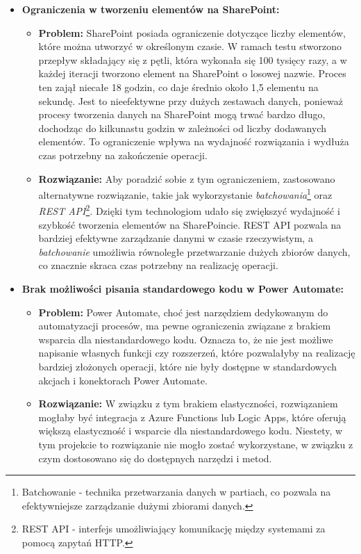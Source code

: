 \begin{itemize}
      \item \textbf{Ograniczenia w tworzeniu elementów na SharePoint:}
            \begin{itemize}
                  \item \textbf{Problem:} SharePoint posiada ograniczenie dotyczące liczby elementów, które można utworzyć w określonym czasie. W ramach testu stworzono przepływ składający się z pętli, która wykonała się 100 tysięcy razy, a w każdej iteracji tworzono element na SharePoint o losowej nazwie. Proces ten zajął niecałe 18 godzin, co daje średnio około 1,5 elementu na sekundę. Jest to nieefektywne przy dużych zestawach danych, ponieważ procesy tworzenia danych na SharePoint mogą trwać bardzo długo, dochodząc do kilkunastu godzin w zależności od liczby dodawanych elementów. To ograniczenie wpływa na wydajność rozwiązania i wydłuża czas potrzebny na zakończenie operacji.
                  \item \textbf{Rozwiązanie:} Aby poradzić sobie z tym ograniczeniem, zastosowano alternatywne rozwiązanie, takie jak wykorzystanie \emph{batchowania}\footnote{Batchowanie - technika przetwarzania danych w partiach, co pozwala na efektywniejsze zarządzanie dużymi zbiorami danych.} oraz \emph{REST API}\footnote{REST API - interfejs umożliwiający komunikację między systemami za pomocą zapytań HTTP.}. Dzięki tym technologiom udało się zwiększyć wydajność i szybkość tworzenia elementów na SharePoincie. REST API pozwala na bardziej efektywne zarządzanie danymi w czasie rzeczywistym, a \emph{batchowanie} umożliwia równoległe przetwarzanie dużych zbiorów danych, co znacznie skraca czas potrzebny na realizację operacji.
            \end{itemize}

      \item \textbf{Brak możliwości pisania standardowego kodu w Power Automate:}
            \begin{itemize}
                  \item \textbf{Problem:} Power Automate, choć jest narzędziem dedykowanym do automatyzacji procesów, ma pewne ograniczenia związane z brakiem wsparcia dla niestandardowego kodu. Oznacza to, że nie jest możliwe napisanie własnych funkcji czy rozszerzeń, które pozwalałyby na realizację bardziej złożonych operacji, które nie były dostępne w standardowych akcjach i konektorach Power Automate.
                  \item \textbf{Rozwiązanie:} W związku z tym brakiem elastyczności, rozwiązaniem mogłaby być integracja z Azure Functions lub Logic Apps, które oferują większą elastyczność i wsparcie dla niestandardowego kodu. Niestety, w tym projekcie to rozwiązanie nie mogło zostać wykorzystane, w związku z czym dostosowano się do dostępnych narzędzi i metod.
            \end{itemize}


\end{itemize}
